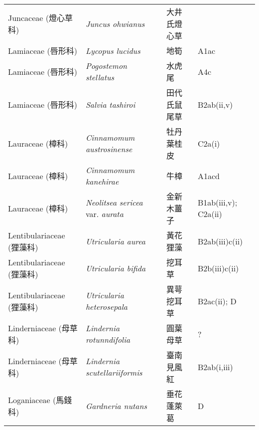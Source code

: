 \begin{longtable}{p{3cm}p{5cm}p{3cm}p{4cm}}
    Juncaceae (燈心草科) & \textit{Juncus ohwianus}  & 大井氏燈心草 &  \index{Juncus@\textit{Juncus}!ohwianus@\textit{ohwianus}}  \index{大井氏燈心草} \\
    Lamiaceae (唇形科) & \textit{Lycopus lucidus}  & 地筍 & A1ac \index{Lycopus@\textit{Lycopus}!lucidus@\textit{lucidus}}  \index{地筍} \\
    Lamiaceae (唇形科) & \textit{Pogostemon stellatus}  & 水虎尾 & A4c \index{Pogostemon@\textit{Pogostemon}!stellatus@\textit{stellatus}}  \index{水虎尾} \\
    Lamiaceae (唇形科) & \textit{Salvia tashiroi}  & 田代氏鼠尾草 & B2ab(ii,v) \index{Salvia@\textit{Salvia}!tashiroi@\textit{tashiroi}}  \index{田代氏鼠尾草} \\
    Lauraceae (樟科) & \textit{Cinnamomum austrosinense}  & 牡丹葉桂皮 & C2a(i) \index{Cinnamomum@\textit{Cinnamomum}!austrosinense@\textit{austrosinense}}  \index{牡丹葉桂皮} \\
    Lauraceae (樟科) & \textit{Cinnamomum kanehirae}  & 牛樟 & A1acd \index{Cinnamomum@\textit{Cinnamomum}!kanehirae@\textit{kanehirae}}  \index{牛樟} \\
    Lauraceae (樟科) & \textit{Neolitsea sericea} var. \textit{aurata}  & 金新木薑子 & B1ab(iii,v); C2a(ii) \index{Neolitsea@\textit{Neolitsea}!sericea@\textit{sericea}!var. aurata@var. \textit{aurata}}  \index{金新木薑子} \\
    Lentibulariaceae (狸藻科) & \textit{Utricularia aurea}  & 黃花狸藻 & B2ab(iii)c(ii) \index{Utricularia@\textit{Utricularia}!aurea@\textit{aurea}}  \index{黃花狸藻} \\
    Lentibulariaceae (狸藻科) & \textit{Utricularia bifida}  & 挖耳草 & B2b(iii)c(ii) \index{Utricularia@\textit{Utricularia}!bifida@\textit{bifida}}  \index{挖耳草} \\
    Lentibulariaceae (狸藻科) & \textit{Utricularia heterosepala}  & 異萼挖耳草 & B2ac(ii); D \index{Utricularia@\textit{Utricularia}!heterosepala@\textit{heterosepala}}  \index{異萼挖耳草} \\
    Linderniaceae (母草科) & \textit{Lindernia rotunndifolia}  & 圓葉母草 & ? \index{Lindernia@\textit{Lindernia}!rotunndifolia@\textit{rotunndifolia}}  \index{圓葉母草} \\
    Linderniaceae (母草科) & \textit{Lindernia scutellariiformis}  & 臺南見風紅 & B2ab(i,iii) \index{Lindernia@\textit{Lindernia}!scutellariiformis@\textit{scutellariiformis}}  \index{臺南見風紅} \\
    Loganiaceae (馬錢科) & \textit{Gardneria nutans}  & 垂花蓬萊葛 & D \index{Gardneria@\textit{Gardneria}!nutans@\textit{nutans}}  \index{垂花蓬萊葛} \\

\end{longtable}
